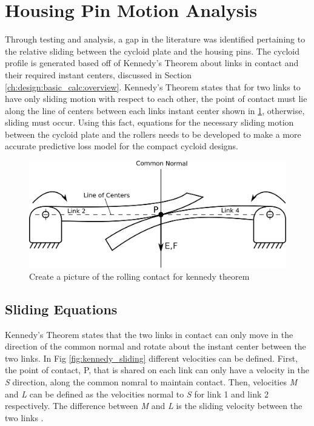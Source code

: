 \section{Housing Pin Motion Analysis} \label{ch:design:pin_roll_1s}

Through testing and analysis, a gap in the literature was identified pertaining to the relative sliding between the cycloid plate and the housing pins. The cycloid profile is generated based off of Kennedy's Theorem about links in contact and their required instant centers, discussed in Section \ref{ch:design:basic_calc:overview}. Kennedy's Theorem states that for two links to have only sliding motion with respect to each other, the point of contact must lie along the line of centers between each links instant center shown in \ref{fig:kennedy_rolling}, otherwise, sliding must occur. Using this fact, equations for the necessary sliding motion between the cycloid plate and the rollers needs to be developed to make a more accurate predictive loss model for the compact cycloid designs.

\begin{figure}[!b]
   \centering
   \includegraphics[width=0.7\linewidth]{fig/kennedy_rolling}
   \caption{Create a picture of the rolling contact for kennedy theorem}
   \label{fig:kennedy_rolling}
\end{figure}

\subsection{Sliding Equations} \label{ch:design:pin_roll_1s:sliding_equations}

Kennedy's Theorem states that the two links in contact can only move in the direction of the common normal and rotate about the instant center between the two links. In Fig \ref{fig:kennedy_sliding} different velocities can be defined. First, the point of contact, P, that is shared on each link can only have a velocity in the \textit{S} direction, along the common nomral to maintain contact. Then, velocities \textit{M} and \textit{L} can be defined as the velocities normal to \textit{S} for link 1 and link 2 respectively. The difference between \textit{M} and \textit{L} is the sliding velocity between the two links \cite{ref:kinematics_and_dynamics}.

